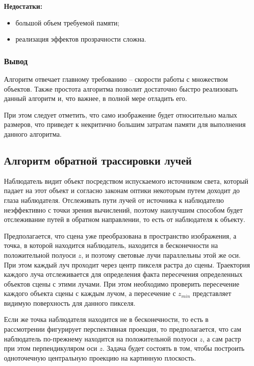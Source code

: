 \documentclass[a4paper,14pt, unknownkeysallowed]{extreport}
\begin{document}
\textbf{Недостатки:}

\begin{itemize}
	\item большой объем требуемой памяти;
	\item реализация эффектов прозрачности сложна.
\end{itemize}

\subsubsection{Вывод}

Алгоритм отвечает главному требованию -- скорости работы с множеством объектов. Также простота алгоритма позволит достаточно быстро реализовать данный алгоритм и, что важнее, в полной мере отладить его.

При этом следует отметить, что само изображение будет относительно малых размеров, что приведет к некритично большим затратам памяти для выполнения данного алгоритма.

\subsection{Алгоритм обратной трассировки лучей}

Наблюдатель видит объект посредством испускаемого источником света, который падает на этот объект и согласно законам оптики некоторым путем доходит до глаза наблюдателя. Отслеживать пути лучей от источника к наблюдателю неэффективно с точки зрения вычислений, поэтому наилучшим способом будет отслеживание путей в обратном направлении, то есть от наблюдателя к объекту.

Предполагается, что сцена уже преобразована в пространство изображения, а точка, в которой находится наблюдатель, находится в бесконечности на положительной полуоси $z$, и поэтому световые лучи параллельны этой же оси. При этом каждый луч проходит через центр пикселя растра до сцены. Траектория каждого луча отслеживается для определения факта пересечения определенных объектов сцены с этими лучами. При этом необходимо проверить пересечение каждого объекта сцены с каждым лучом, а пересечение с $z_{min}$ представляет видимую поверхность для данного пикселя.

Если же точка наблюдателя находится не в бесконечности, то есть в рассмотрении фигурирует перспективная проекция, то предполагается, что сам наблюдатель по-прежнему находится на положительной полуоси $z$, а сам растр при этом перпендикуляром оси $z$. Задача будет состоять в том, чтобы построить одноточечную центральную проекцию на картинную плоскость.
\end{document}
